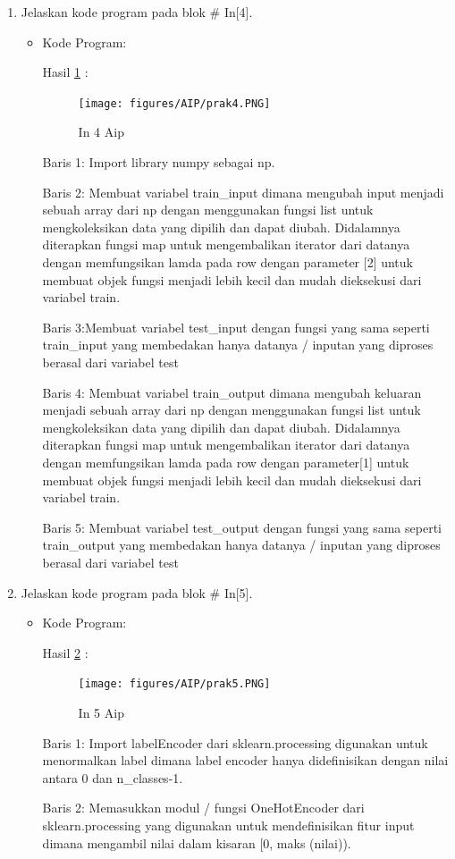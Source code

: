 \begin{enumerate}
\item Jelaskan kode program pada blok \# In[4].
\begin{itemize}
\item Kode Program:

\par Hasil \ref{in4aip} :
\begin{figure}[!hbtp]
\centering
\texttt{[image: figures/AIP/prak4.PNG]}
\caption{In 4 Aip}
\label{in4aip}
\end{figure}
\par Baris 1: Import library numpy sebagai np.
\par Baris 2: Membuat variabel train\_input dimana mengubah input menjadi sebuah array dari np dengan menggunakan fungsi list untuk mengkoleksikan data yang dipilih dan dapat diubah. Didalamnya diterapkan fungsi map untuk mengembalikan iterator dari datanya dengan memfungsikan lamda pada row dengan parameter [2] untuk membuat objek fungsi menjadi lebih kecil dan mudah dieksekusi dari variabel train.
\par Baris 3:Membuat variabel test\_input dengan fungsi yang sama seperti train\_input yang membedakan hanya datanya / inputan yang diproses berasal dari variabel test
\par Baris 4: Membuat variabel train\_output dimana mengubah keluaran menjadi sebuah array dari np dengan menggunakan fungsi list untuk mengkoleksikan data yang dipilih dan dapat diubah. Didalamnya diterapkan fungsi map untuk mengembalikan iterator dari datanya dengan memfungsikan lamda pada row dengan parameter[1] untuk membuat objek fungsi menjadi lebih kecil dan mudah dieksekusi dari variabel train.
\par Baris 5: Membuat variabel test\_output dengan fungsi yang sama seperti train\_output yang membedakan hanya datanya / inputan yang diproses berasal dari variabel test
\end{itemize}
\par

\item Jelaskan kode program pada blok \# In[5].
\begin{itemize}
\item Kode Program:

\par Hasil \ref{in5aip} :
\begin{figure}[!hbtp]
\centering
\texttt{[image: figures/AIP/prak5.PNG]}
\caption{In 5 Aip}
\label{in5aip}
\end{figure}
\par Baris 1: Import labelEncoder dari sklearn.processing digunakan untuk menormalkan label dimana label encoder hanya didefinisikan dengan nilai antara 0 dan n\_classes-1.
\par Baris 2: Memasukkan modul / fungsi OneHotEncoder dari sklearn.processing yang digunakan untuk mendefinisikan fitur input dimana mengambil nilai dalam kisaran [0, maks (nilai)).
\end{itemize}
\par


\end{enumerate}
